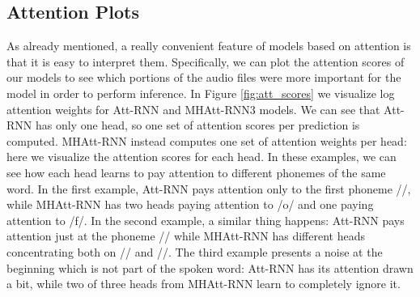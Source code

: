 \subsection{Attention Plots}
As already mentioned, a really convenient feature of models based on attention is that it is easy to interpret them. Specifically, we can plot the attention scores of our models to see which portions of the audio files were more important for the model in order to perform inference. In Figure \ref{fig:att_scores} we visualize log attention weights for Att-RNN and MHAtt-RNN3 models. 
We can see that Att-RNN has only one head, so one set of attention scores per prediction is computed. MHAtt-RNN instead computes one set of attention weights per head: here we visualize the attention scores for each head. In these examples, we can see how each head learns to pay attention to different phonemes of the same word. In the first example, Att-RNN pays attention only to the first phoneme //, while MHAtt-RNN has two heads paying attention to /o/ and one paying attention to /f/. In the second example, a similar thing happens: Att-RNN pays attention just at the phoneme // while MHAtt-RNN has different heads concentrating both on // and //. The third example presents a noise at the beginning which is not part of the spoken word: Att-RNN has its attention drawn a bit, while two of three heads from MHAtt-RNN learn to completely ignore it.


